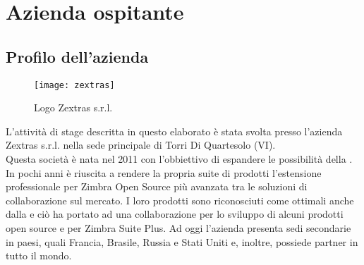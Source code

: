 \chapter{Azienda ospitante}\label{chap:company}

\section{Profilo dell'azienda}
\begin{figure}[H] 
	\centering
	\texttt{[image: zextras]}
	\caption{Logo Zextras s.r.l.}
	\label{fig:logoZextras}
\end{figure}
L'attività di stage descritta in questo elaborato è stata svolta presso l'azienda Zextras s.r.l. nella sede principale di Torri Di Quartesolo (VI). \\
Questa società è nata nel 2011 con l'obbiettivo di espandere le possibilità della .
In pochi anni è riuscita a rendere la propria suite di prodotti l'estensione professionale per Zimbra Open Source più avanzata tra le soluzioni di collaborazione sul mercato. I loro prodotti sono riconosciuti come ottimali anche dalla  e ciò ha portato ad una collaborazione per lo sviluppo di alcuni prodotti open source e per Zimbra Suite Plus.
Ad oggi l'azienda presenta sedi secondarie in paesi, quali Francia, Brasile, Russia e Stati Uniti e, inoltre, possiede partner in tutto il mondo.\\


